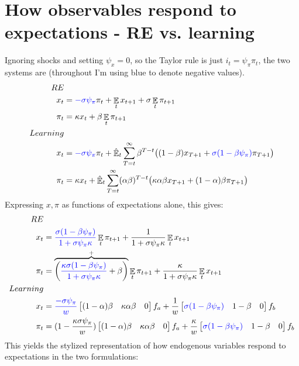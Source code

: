 \documentclass[11pt]{article}
\renewcommand{\[}{\begin{equation}}
\renewcommand{\]}{\end{equation}}
\DeclareMathOperator{\E}{\mathbb{E}}
\begin{document}
\section{How observables respond to expectations - RE vs. learning}
Ignoring shocks and setting $\psi_x = 0$, so the Taylor rule is just $i_t =  \psi_{\pi}\pi_t$, the two systems are
(throughout I'm using blue to denote negative values).
\begin{align*}
RE& \\
x_t &= \textcolor{blue}{- \sigma \psi_{\pi}} \pi_t+  \E_t x_{t+1}   + \sigma \E_t \pi_{t+1}  \\
\pi_t &= \kappa x_t +\beta \E_t \pi_{t+1} \\
Learning & \\
x_t &= \textcolor{blue}{ -\sigma \psi_{\pi}} \pi_t +\hat{\E}_t \sum_{T=t}^{\infty} \beta^{T-t }\big( (1-\beta) x_{T+1} + \textcolor{blue}{\sigma(1- \beta \psi_{\pi})}\pi_{T+1} \big)  \\
\pi_t &= \kappa x_t +\hat{\E}_t \sum_{T=t}^{\infty} (\alpha\beta)^{T-t }\big( \kappa \alpha \beta x_{T+1} + (1-\alpha)\beta \pi_{T+1} \big)
\end{align*}
Expressing $x, \pi$ as functions of expectations alone, this gives:
\begin{align*}
RE& \\
x_t &=  \textcolor{blue}{ \frac{\sigma(1-\beta\psi_{\pi})}{1+\sigma\psi_{\pi}\kappa}}\E_t \pi_{t+1}   +   \frac{1}{1+\sigma\psi_{\pi}\kappa}\E_t x_{t+1}  \\
\pi_t &=   \overbrace{\bigg( \textcolor{blue}{\frac{\kappa\sigma(1-\beta\psi_{\pi})}{1+\sigma\psi_{\pi}\kappa}}+\beta\bigg)}^{+}\E_t \pi_{t+1} +   \frac{\kappa}{1+\sigma\psi_{\pi}\kappa}\E_t x_{t+1} \\
Learning & \\
x_t & = \textcolor{blue}{\frac{-\sigma\psi_{\pi}}{w}} \begin{bmatrix} (1-\alpha)\beta&\kappa\alpha\beta & 0 \end{bmatrix} f_a + \frac{1}{w}\begin{bmatrix} \textcolor{blue}{\sigma(1-\beta\psi_{\pi})}&1-\beta & 0\end{bmatrix} f_b \\
\pi_t & = (1-\frac{\kappa\sigma\psi_{\pi}}{w}) \begin{bmatrix} (1-\alpha)\beta&\kappa\alpha\beta & 0 \end{bmatrix} f_a + \frac{\kappa}{w}\begin{bmatrix}  \textcolor{blue}{\sigma(1-\beta\psi_{\pi})}&1-\beta & 0\end{bmatrix} f_b
\end{align*}
This yields the stylized representation of how endogenous variables respond to expectations in the two formulations:
\end{document}
